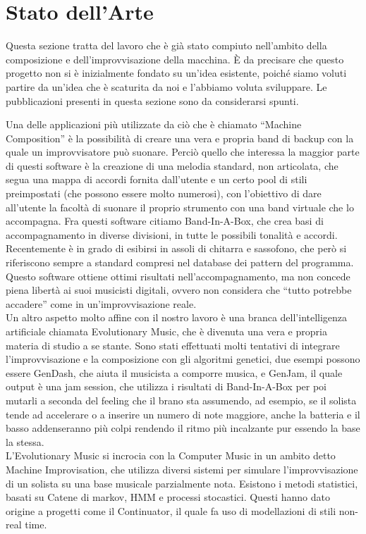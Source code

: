 \section{Stato dell'Arte}
Questa sezione tratta del lavoro che è già stato compiuto nell'ambito della composizione e dell'improvvisazione della macchina.
È da precisare che questo progetto non si è inizialmente fondato su un'idea esistente, poiché siamo voluti partire da un'idea che è scaturita da noi e l'abbiamo voluta sviluppare.
Le pubblicazioni presenti in questa sezione sono da considerarsi spunti.
\newline

Una delle applicazioni più utilizzate da ciò che è chiamato ``Machine Composition'' è la possibilità di creare una vera e propria band di backup con la quale un improvvisatore può suonare.
Perciò quello che interessa la maggior parte di questi software è la creazione di una melodia standard, non articolata, che segua una mappa di accordi fornita dall'utente e un certo pool di stili preimpostati (che possono essere molto numerosi), con l'obiettivo di dare all'utente la facoltà di suonare il proprio strumento con una band virtuale che lo accompagna.
Fra questi software citiamo Band-In-A-Box\cite{biab}, che crea basi di accompagnamento in diverse divisioni, in tutte le possibili tonalità e accordi.
Recentemente è in grado di esibirsi in assoli di chitarra e sassofono, che però si riferiscono sempre a standard compresi nel database dei pattern del programma.
Questo software ottiene ottimi risultati nell'accompagnamento, ma non concede piena libertà ai suoi musicisti digitali, ovvero non considera che ``tutto potrebbe accadere'' come in un'improvvisazione reale.
\\
Un altro aspetto molto affine con il nostro lavoro è una branca dell'intelligenza artificiale chiamata Evolutionary Music, che è divenuta una vera e propria materia di studio a se stante\cite{evomus}.
Sono stati effettuati molti tentativi di integrare l'improvvisazione e la composizione con gli algoritmi genetici, due esempi possono essere GenDash\cite{gendash}, che aiuta il musicista a comporre  musica, e GenJam\cite{genjam}, il quale output è una jam session, che utilizza i risultati di Band-In-A-Box per poi mutarli a seconda del feeling che il brano sta assumendo, ad esempio, se il solista tende ad accelerare o a inserire un numero di note maggiore, anche la batteria e il basso addenseranno più colpi rendendo il ritmo più incalzante pur essendo la base la stessa.
\\
L'Evolutionary Music si incrocia con la Computer Music in un ambito detto Machine Improvisation, che utilizza diversi sistemi per simulare l'improvvisazione di un solista su una base musicale parzialmente nota.
Esistono i metodi statistici, basati su Catene di markov, HMM e processi stocastici\cite{hmm}.
Questi hanno dato origine a progetti come il Continuator\cite{cont}, il quale fa uso di modellazioni di stili non-real time\cite{dubnov}.
\newline


